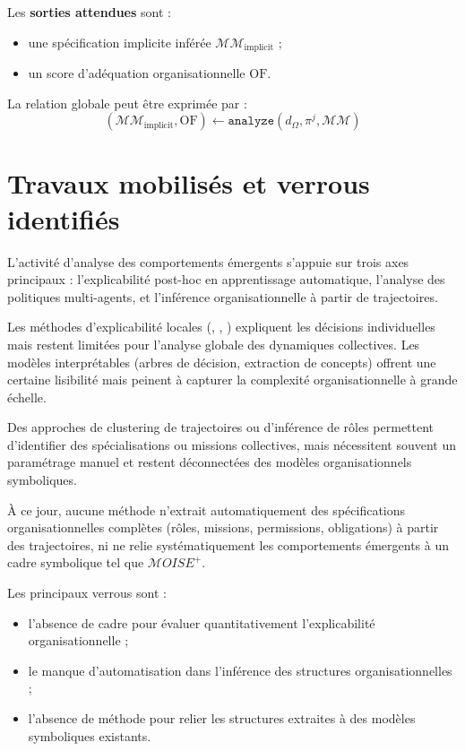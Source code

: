 Les \textbf{sorties attendues} sont :
\begin{itemize}
  \item une spécification implicite inférée $\mathcal{MM}_{\text{implicit}}$ ;
  \item un score d'adéquation organisationnelle $\text{OF}$.
\end{itemize}

\noindent La relation globale peut être exprimée par :
\[
  (\mathcal{MM}_{\text{implicit}}, \text{OF}) \gets \texttt{analyze}(d_\Omega, \pi^j, \mathcal{MM})
\]


\section{Travaux mobilisés et verrous identifiés}

L'activité d'analyse des comportements émergents s'appuie sur trois axes principaux : l'explicabilité post-hoc en apprentissage automatique, l'analyse des politiques multi-agents, et l'inférence organisationnelle à partir de trajectoires.

Les méthodes d'explicabilité locales (, , ) expliquent les décisions individuelles mais restent limitées pour l'analyse globale des dynamiques collectives. Les modèles interprétables (arbres de décision, extraction de concepts) offrent une certaine lisibilité mais peinent à capturer la complexité organisationnelle à grande échelle.

Des approches de clustering de trajectoires ou d'inférence de rôles permettent d'identifier des spécialisations ou missions collectives, mais nécessitent souvent un paramétrage manuel et restent déconnectées des modèles organisationnels symboliques.

À ce jour, aucune méthode n'extrait automatiquement des spécifications organisationnelles complètes (rôles, missions, permissions, obligations) à partir des trajectoires, ni ne relie systématiquement les comportements émergents à un cadre symbolique tel que $\mathcal{M}OISE^+$.

Les principaux verrous sont :
\begin{itemize}
  \item l'absence de cadre pour évaluer quantitativement l'explicabilité organisationnelle ;
  \item le manque d'automatisation dans l'inférence des structures organisationnelles ;
  \item l'absence de méthode pour relier les structures extraites à des modèles symboliques existants.
\end{itemize}

